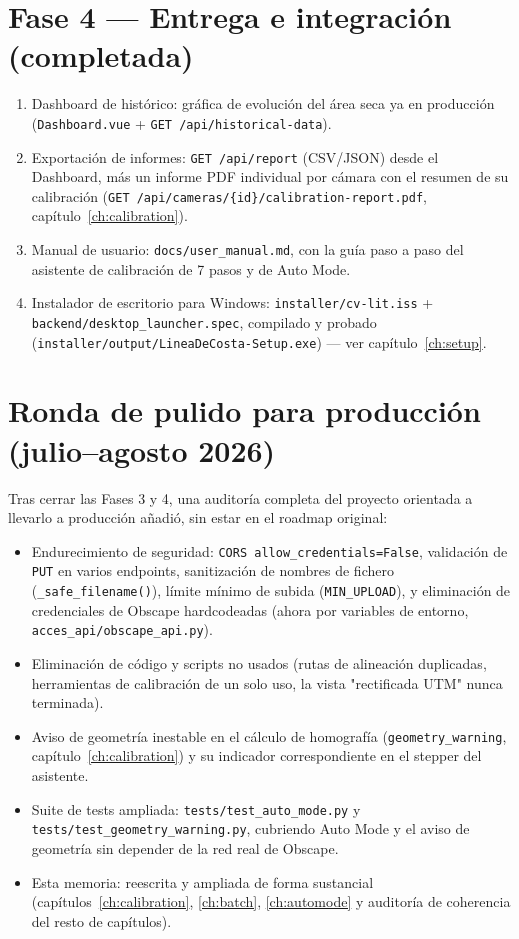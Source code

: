 \section{Fase 4 — Entrega e integración (completada)}

\begin{enumerate}[leftmargin=1.5em]
  \item Dashboard de histórico: gráfica de evolución del área seca ya en producción
        (\texttt{Dashboard.vue} + \texttt{GET /api/historical-data}).
  \item Exportación de informes: \texttt{GET /api/report} (CSV/JSON) desde el Dashboard, más un
        informe PDF individual por cámara con el resumen de su calibración
        (\texttt{GET /api/cameras/\{id\}/calibration-report.pdf}, capítulo~\ref{ch:calibration}).
  \item Manual de usuario: \texttt{docs/user\_manual.md}, con la guía paso a paso del asistente
        de calibración de 7 pasos y de Auto Mode.
  \item Instalador de escritorio para Windows: \texttt{installer/cv-lit.iss} +
        \texttt{backend/desktop\_launcher.spec}, compilado y probado
        (\texttt{installer/output/LineaDeCosta-Setup.exe}) — ver capítulo~\ref{ch:setup}.
\end{enumerate}

\section{Ronda de pulido para producción (julio--agosto 2026)}

Tras cerrar las Fases 3 y 4, una auditoría completa del proyecto orientada a llevarlo a
producción añadió, sin estar en el roadmap original:

\begin{itemize}[leftmargin=1.5em]
  \item Endurecimiento de seguridad: \texttt{CORS allow\_credentials=False}, validación de
        \texttt{PUT} en varios endpoints, sanitización de nombres de fichero
        (\texttt{\_safe\_filename()}), límite mínimo de subida (\texttt{MIN\_UPLOAD}), y
        eliminación de credenciales de Obscape hardcodeadas (ahora por variables de entorno,
        \texttt{acces\_api/obscape\_api.py}).
  \item Eliminación de código y scripts no usados (rutas de alineación duplicadas, herramientas
        de calibración de un solo uso, la vista "rectificada UTM" nunca terminada).
  \item Aviso de geometría inestable en el cálculo de homografía (\texttt{geometry\_warning},
        capítulo~\ref{ch:calibration}) y su indicador correspondiente en el stepper del
        asistente.
  \item Suite de tests ampliada: \texttt{tests/test\_auto\_mode.py} y
        \texttt{tests/test\_geometry\_warning.py}, cubriendo Auto Mode y el aviso de geometría
        sin depender de la red real de Obscape.
  \item Esta memoria: reescrita y ampliada de forma sustancial (capítulos~\ref{ch:calibration},
        \ref{ch:batch}, \ref{ch:automode} y auditoría de coherencia del resto de capítulos).
\end{itemize}


